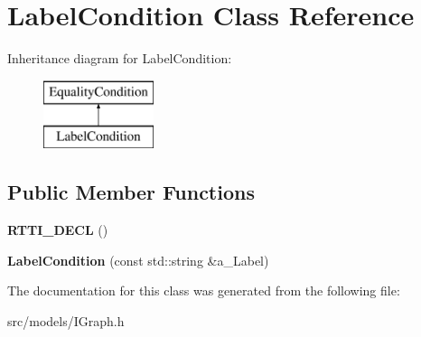 \hypertarget{class_label_condition}{}\section{Label\+Condition Class Reference}
\label{class_label_condition}
Inheritance diagram for Label\+Condition\+:\begin{figure}[H]
\begin{center}
\leavevmode
\includegraphics[height=2.000000cm]{class_label_condition}
\end{center}
\end{figure}
\subsection*{Public Member Functions}
\begin{DoxyCompactItemize}
\item 
\mbox{\label{class_label_condition_ac53133a7297e5b023d05d4564f03a31a}} 
{\bfseries R\+T\+T\+I\+\_\+\+D\+E\+CL} ()
\item 
\mbox{\label{class_label_condition_a76461da72bada2d78589732fdf8740e3}} 
{\bfseries Label\+Condition} (const std\+::string \&a\+\_\+\+Label)
\end{DoxyCompactItemize}


The documentation for this class was generated from the following file\+:\begin{DoxyCompactItemize}
\item 
src/models/I\+Graph.\+h\end{DoxyCompactItemize}

